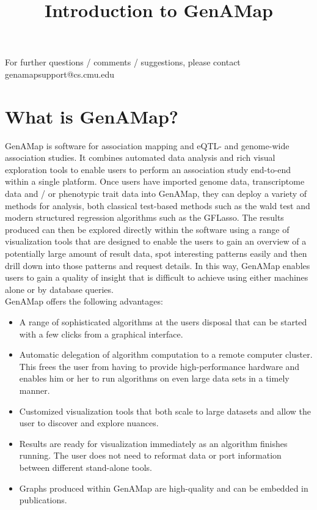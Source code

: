 \documentclass[12pt]{article}
\title{Introduction to GenAMap}
\author{}
\date{}
\begin{document}
\maketitle

\begin{raggedright}
For further questions / comments / suggestions, please contact genamapsupport@cs.cmu.edu

\end{raggedright}

\section{What is GenAMap?}

GenAMap is software for association mapping and eQTL- and genome-wide association studies. It combines automated data analysis and rich visual exploration tools to enable users to perform an association study end-to-end within a single platform. Once users have imported genome data, transcriptome data and / or phenotypic trait data into GenAMap, they can deploy a variety of methods for analysis, both classical test-based methods such as the wald test and modern structured regression algorithms such as the GFLasso. The results produced can then be explored directly within the software using a range of visualization tools that are designed to enable the users to gain an overview of a potentially large amount of result data, spot interesting patterns easily and then drill down into those patterns and request details. In this way, GenAMap enables users to gain a quality of insight that is difficult to achieve using either machines alone or by database queries.\\

GenAMap offers the following advantages: 

\begin{itemize}
\item A range of sophisticated algorithms at the users disposal that can be started with a few clicks from a graphical interface. 
\item Automatic delegation of algorithm computation to a remote computer cluster. This frees the user from having to provide high-performance hardware and enables him or her to run algorithms on even large data sets in a timely manner.
\item Customized visualization tools that both scale to large datasets and allow the user to discover and explore nuances. 
\item Results are ready for visualization immediately as an algorithm finishes running. The user does not need to reformat data or port information between different stand-alone tools.
\item Graphs produced within GenAMap are high-quality and can be embedded in publications.
\end{itemize}
\end{document}
